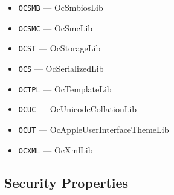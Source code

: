 \documentclass[]{article}
\begin{document}
\begin{enumerate}
\begin{itemize}
  \item \texttt{OCSMB} --- OcSmbiosLib
  \item \texttt{OCSMC} --- OcSmcLib
  \item \texttt{OCST} --- OcStorageLib
  \item \texttt{OCS} --- OcSerializedLib
  \item \texttt{OCTPL} --- OcTemplateLib
  \item \texttt{OCUC} --- OcUnicodeCollationLib
  \item \texttt{OCUT} --- OcAppleUserInterfaceThemeLib
  \item \texttt{OCXML} --- OcXmlLib
  \end{itemize}

\end{enumerate}

\subsection{Security Properties}\label{miscsecurityprops}
\end{document}
